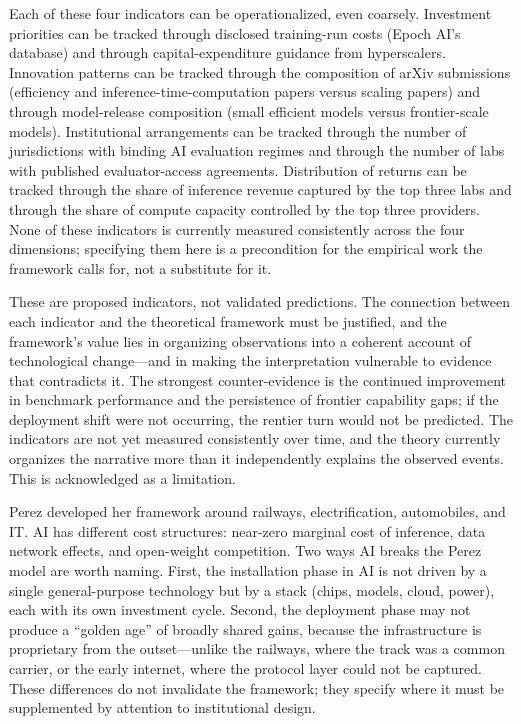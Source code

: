Each of these four indicators can be operationalized, even coarsely. Investment priorities can be tracked through disclosed training-run costs (Epoch AI's database) and through capital-expenditure guidance from hyperscalers. Innovation patterns can be tracked through the composition of arXiv submissions (efficiency and inference-time-computation papers versus scaling papers) and through model-release composition (small efficient models versus frontier-scale models). Institutional arrangements can be tracked through the number of jurisdictions with binding AI evaluation regimes and through the number of labs with published evaluator-access agreements. Distribution of returns can be tracked through the share of inference revenue captured by the top three labs and through the share of compute capacity controlled by the top three providers. None of these indicators is currently measured consistently across the four dimensions; specifying them here is a precondition for the empirical work the framework calls for, not a substitute for it.

These are proposed indicators, not validated predictions. The connection between each indicator and the theoretical framework must be justified, and the framework's value lies in organizing observations into a coherent account of technological change---and in making the interpretation vulnerable to evidence that contradicts it. The strongest counter-evidence is the continued improvement in benchmark performance and the persistence of frontier capability gaps; if the deployment shift were not occurring, the rentier turn would not be predicted. The indicators are not yet measured consistently over time, and the theory currently organizes the narrative more than it independently explains the observed events. This is acknowledged as a limitation.

Perez developed her framework around railways, electrification, automobiles, and IT. AI has different cost structures: near-zero marginal cost of inference, data network effects, and open-weight competition. Two ways AI breaks the Perez model are worth naming. First, the installation phase in AI is not driven by a single general-purpose technology but by a stack (chips, models, cloud, power), each with its own investment cycle. Second, the deployment phase may not produce a ``golden age'' of broadly shared gains, because the infrastructure is proprietary from the outset---unlike the railways, where the track was a common carrier, or the early internet, where the protocol layer could not be captured. These differences do not invalidate the framework; they specify where it must be supplemented by attention to institutional design.
